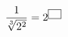 $\dfrac{1}{\sqrt[3]{2^2}}=2^{\text{\scriptsize\setlength{\fboxsep}{1.5pt}\framebox[1.5em]{\rule{0pt}{1.6ex}}}}$
